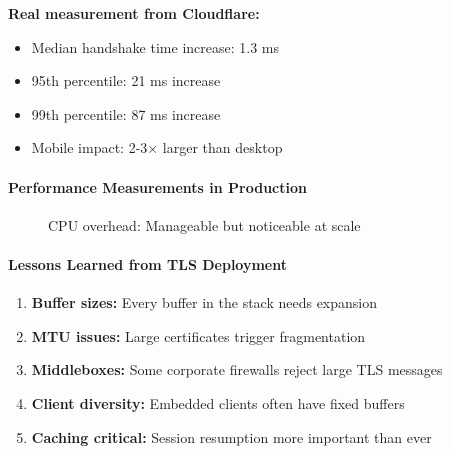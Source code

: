 \documentclass[11pt,a4paper]{article}
\begin{document}
\textbf{Real measurement from Cloudflare:}
\begin{itemize}
    \item Median handshake time increase: 1.3 ms
    \item 95th percentile: 21 ms increase
    \item 99th percentile: 87 ms increase
    \item Mobile impact: 2-3× larger than desktop
\end{itemize}

\paragraph{Performance Measurements in Production}

\begin{figure}[h]
\centering
{}
\caption{CPU overhead: Manageable but noticeable at scale}
\end{figure}

\paragraph{Lessons Learned from TLS Deployment}

\begin{enumerate}
    \item \textbf{Buffer sizes:} Every buffer in the stack needs expansion
    \item \textbf{MTU issues:} Large certificates trigger fragmentation
    \item \textbf{Middleboxes:} Some corporate firewalls reject large TLS messages
    \item \textbf{Client diversity:} Embedded clients often have fixed buffers
    \item \textbf{Caching critical:} Session resumption more important than ever
\end{enumerate}
\end{document}
